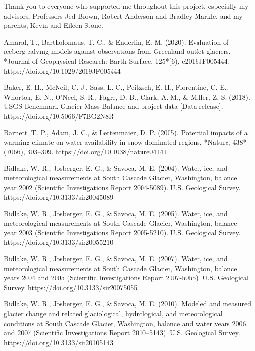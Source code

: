 \documentclass{article}
\begin{document}
Thank you to everyone who supported me throughout this project, especially my advisors, Professors Jed Brown, Robert Anderson and Bradley Markle, and my parents, Kevin 
and Eileen Stone.
\begin{thebibliography}{}

    Amaral, T., Bartholomaus, T. C., \& Enderlin, E. M. (2020). Evaluation of iceberg calving models against observations from Greenland outlet glaciers. *Journal of Geophysical Research: Earth Surface, 125*(6), e2019JF005444. https://doi.org/10.1029/2019JF005444

    Baker, E. H., McNeil, C. J., Sass, L. C., Peitzsch, E. H., Florentine, C. E., Whorton, E. N., O’Neel, S. R., Fagre, D. B., Clark, A. M., \& Miller, Z. S. (2018). USGS Benchmark Glacier Mass Balance and project data [Data release]. https://doi.org/10.5066/F7BG2N8R

    Barnett, T. P., Adam, J. C., \& Lettenmaier, D. P. (2005). Potential impacts of a warming climate on water availability in snow-dominated regions. *Nature, 438*(7066), 303–309. https://doi.org/10.1038/nature04141

    Bidlake, W. R., Josberger, E. G., \& Savoca, M. E. (2004). Water, ice, and meteorological measurements at South Cascade Glacier, Washington, balance year 2002 (Scientific Investigations Report 2004-5089). U.S. Geological Survey. https://doi.org/10.3133/sir20045089
    
    Bidlake, W. R., Josberger, E. G., \& Savoca, M. E. (2005). Water, ice, and meteorological measurements at South Cascade Glacier, Washington, balance year 2003 (Scientific Investigations Report 2005-5210). U.S. Geological Survey. https://doi.org/10.3133/sir20055210

    Bidlake, W. R., Josberger, E. G., \& Savoca, M. E. (2007). Water, ice, and meteorological measurements at South Cascade Glacier, Washington, balance years 2004 and 2005 (Scientific Investigations Report 2007-5055). U.S. Geological Survey. https://doi.org/10.3133/sir20075055

    Bidlake, W. R., Josberger, E. G., \& Savoca, M. E. (2010). Modeled and measured glacier change and related glaciological, hydrological, and meteorological conditions at South Cascade Glacier, Washington, balance and water years 2006 and 2007 (Scientific Investigations Report 2010–5143). U.S. Geological Survey. https://doi.org/10.3133/sir20105143


\end{thebibliography}
\end{document}
